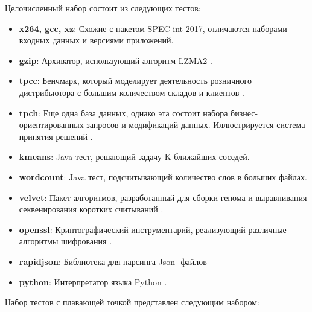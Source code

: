 Целочисленный набор состоит из следующих тестов:
\begin{itemize}
	\item  \textbf{x264, gcc, xz}: Схожие с пакетом SPEC int 2017, отличаются наборами входных данных и версиями приложений.
	\item  \textbf{gzip}: Архиватор, использующий алгоритм LZMA2 \cite{akoguz2016comparison}.
	\item  \textbf{tpcc}: Бенчмарк, который моделирует  деятельность розничного дистрибьютора с большим количеством складов и клиентов \cite{leutenegger1993modeling}.
	\item  \textbf{tpch}: Еще одна база данных, однако эта состоит набора бизнес-ориентированных запросов и модификаций данных. Иллюстрируется система принятия решений \cite{barata2015overview}.
	\item  \textbf{kmeans}: Java тест, решающий задачу K-ближайших соседей.
	\item  \textbf{wordcount}: Java тест, подсчитывающий количество слов в больших файлах. 
	\item  \textbf{velvet}: Пакет алгоритмов, разработанный для сборки генома и выравнивания секвенирования коротких считываний \cite{zerbino2008velvet}. 
	\item  \textbf{openssl}: Криптографический инструментарий, реализующий различные алгоритмы шифрования \cite{rescorla2001introduction}.
	\item  \textbf{rapidjson}: Библиотека для парсинга Json -файлов\cite{keiser2023demand}
	\item  \textbf{python}: Интерпретатор языка Python \cite{python2021python}.
\end{itemize}
Набор тестов с плавающей точкой представлен следующим набором:
